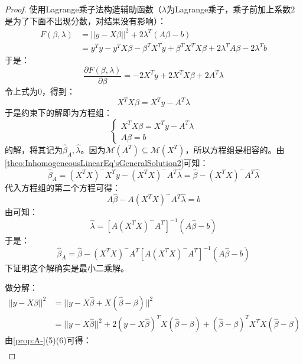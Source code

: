 \begin{proof}
	使用Lagrange乘子法构造辅助函数（$\lambda$为Lagrange乘子，乘子前加上系数$2$是为了下面不出现分数，对结果没有影响）：
	\begin{align*}
		F(\beta,\lambda)&=||y-X\beta||^2+2\lambda^T(A\beta-b) \\
		&=y^Ty-y^TX\beta-\beta^TX^Ty+\beta^TX^TX\beta+2\lambda^TA\beta-2\lambda^Tb
	\end{align*}
	于是：
	\begin{equation*}
		\frac{\partial F(\beta,\lambda)}{\partial\beta}=-2X^Ty+2X^TX\beta+2A^T\lambda
	\end{equation*}
	令上式为$0$，得到：
	\begin{equation*}
		X^TX\beta=X^Ty-A^T\lambda
	\end{equation*}
	于是约束下的解即为方程组：
	\begin{equation*}
		\begin{cases}
			X^TX\beta=X^Ty-A^T\lambda \\
			A\beta=b
		\end{cases}
	\end{equation*}
	的解，将其记为$\hat{\beta}_A,\hat{\lambda}$。因为$\mathcal{M}(A^T)\subseteq\mathcal{M}(X^T)$，所以方程组是相容的。由\cref{theo:InhomogeneousLinearEq'sGeneralSolution2}可知：
	\begin{equation*}
		\hat{\beta}_A=(X^TX)^-X^Ty-(X^TX)^-A^T\hat{\lambda}=\hat{\beta}-(X^TX)^-A^T\hat{\lambda}
	\end{equation*}
	代入方程组的第二个方程可得：
	\begin{equation*}
		A\hat{\beta}-A(X^TX)^-A^T\hat{\lambda}=b
	\end{equation*}
	由可知：
	\begin{equation*}
		\hat{\lambda}=[A(X^TX)^-A^T]^{-1}(A\hat{\beta}-b)
	\end{equation*}
	于是：
	\begin{equation*}
		\hat{\beta}_A=\hat{\beta}-(X^TX)^-A^T[A(X^TX)^-A^T]^{-1}(A\hat{\beta}-b)
	\end{equation*}
	下证明这个解确实是最小二乘解。\par
	做分解：
	\begin{align*}
		||y-X\beta||^2
		&=||y-X\hat{\beta}+X(\hat{\beta}-\beta)||^2 \\
		&=||y-X\hat{\beta}||^2+2(y-X\hat{\beta})^TX(\hat{\beta}-\beta)+(\hat{\beta}-\beta)^TX^TX(\hat{\beta}-\beta)
	\end{align*}
	由\cref{prop:A-}(5)(6)可得：
	\begin{align*}

\end{align*}
\end{proof}
